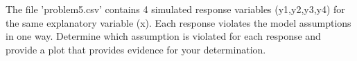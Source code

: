 \item The file 'problem5.csv' contains 4 simulated response variables 
(y1,y2,y3,y4) for the same explanatory variable (x). Each response violates 
the model assumptions in one way. Determine which assumption is violated for 
each response and provide a plot that provides evidence for your determination. 